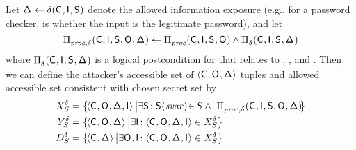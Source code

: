Let $\mathsf{\Delta}_{}\leftarrow \delta_{\mbox{}}(\mathsf{C}_{},\mathsf{I}_{},\mathsf{S}_{})$
denote the allowed information exposure (e.g., for a password checker,
\DCFn{} is whether the input is the legitimate password), and let
\[
\Pi_{\mathit{proc},\delta_{\mbox{}}}^{}(\mathsf{C}_{},\mathsf{I}_{},\mathsf{S}_{},
\mathsf{O}_{}, \mathsf{\Delta}_{})
 \leftarrow \Pi_{\mathit{proc}}^{}(\mathsf{C}_{},\mathsf{I}_{},\mathsf{S}_{}, \mathsf{O}_{})
\wedge
\Pi_{\delta_{\mbox{}}}^{}(\mathsf{C}_{},\mathsf{I}_{},\mathsf{S}_{},\mathsf{\Delta}_{})
\]
where $\Pi_{\delta_{\mbox{}}}^{}(\mathsf{C}_{}, \mathsf{I}_{}, \mathsf{S}_{}, \mathsf{\Delta}_{})$
is a logical postcondition for \declassify{} that relates \DCFn{} to
\ACIFn{}, \AIIFn{}, and \SecFn{}.
Then, we can define the attacker's accessible set
\possibleDoubleWithDeclass{\secretsSet{}} of $\langle
\mathsf{C}_{},\mathsf{O}_{},\mathsf{\Delta}_{}\rangle$ tuples and allowed accessible set
\possibleDeclass{\secretsSet{}} consistent with chosen secret set
\secretsSet{} by
\begin{align}
\possibleTriplesWithDeclass{\secretsSet{}}&=\left\{\!\langle \ACIFn{},\AOOFn{},\DCFn{},\AIIFn{}\rangle
\left|
\exists \SecFn{}\!: \SecFn{}(\SecVar)\!\in\!\secretsSet{}
 \wedge~\hfill
\postcondition{\proc,\declassify{}}{}(\ACIFn{}, \AIIFn{}, \SecFn{},
\AOOFn{}, \DCFn{})
\right.\!\!\right\}
\nonumber\\
\possibleDoubleWithDeclass{\secretsSet{}}&=\left\{\!\langle \ACIFn{}, \AOOFn{}, \DCFn{}\rangle
\left|\exists \AIIFn{}\!: \langle \ACIFn{},\AOOFn{},\DCFn{},\AIIFn{}\rangle\in \possibleTriplesWithDeclass{\secretsSet{}}
\right.\!\right\}
\nonumber\\
\possibleDeclass{\secretsSet{}}&=\left\{\!\langle \ACIFn{},\DCFn{}\rangle
\left|\exists \AOOFn{},\AIIFn{}\!: \langle \ACIFn{},\AOOFn{},\DCFn{},\AIIFn{}\rangle\in \possibleTriplesWithDeclass{\secretsSet{}}
\right.\!\right\}\nonumber
\end{align}


